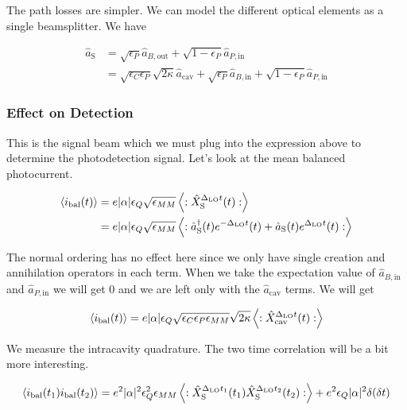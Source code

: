 \documentclass[12pt]{article}
\begin{document}
The path losses are simpler. We can model the different optical elements as a single beamsplitter. We have

\begin{align}
\hat{a}_{\text{S}} &= \sqrt{\epsilon_P}\hat{a}_{B,\text{out}} + \sqrt{1-\epsilon_P}\hat{a}_{P,\text{in}}\\
&= \sqrt{\epsilon_C \epsilon_P} \sqrt{2\kappa}\hat{a}_{\text{cav}} + \sqrt{\epsilon_P}\hat{a}_{B,\text{in}} + \sqrt{1-\epsilon_P}\hat{a}_{P,\text{in}}
\end{align}

\subsubsection{Effect on Detection}

This is the signal beam which we must plug into the expression above to determine the photodetection signal. Let's look at the mean balanced photocurrent.

\begin{align}
\Braket{i_{\text{bal}}(t)} &= e|\alpha|\epsilon_Q \sqrt{\epsilon_{MM}} \Braket{:\hat{X}_{\text{S}}^{\Delta_{\text{LO}}t}(t):}\\
&= e|\alpha|\epsilon_Q \sqrt{\epsilon_{MM}} \Braket{:\hat{a}^{\dag}_{\text{S}}(t)e^{-\Delta_{\text{LO}}t}(t) + \hat{a}_{\text{S}}(t)e^{\Delta_{\text{LO}}t}(t):}
\end{align}

The normal ordering has no effect here since we only have single creation and annihilation operators in each term. When we take the expectation value of $\hat{a}_{B,\text{in}}$ and $\hat{a}_{P,\text{in}}$ we will get $0$ and we are left only with the $\hat{a}_{\text{cav}}$ terms. We will get

\begin{align}
\Braket{i_{\text{bal}}(t)} &= e|\alpha|\epsilon_Q \sqrt{\epsilon_C \epsilon_P \epsilon_{MM}} \sqrt{2\kappa} \Braket{:\hat{X}_{\text{cav}}^{\Delta_{\text{LO}}t}(t):}\\
\end{align}

We measure the intracavity quadrature. The two time correlation will be a bit more interesting.

\begin{align}
\Braket{i_{\text{bal}}(t_1)i_{\text{bal}}(t_2)} = e^2 |\alpha|^2 \epsilon_Q^2 \epsilon_{MM} \Braket{:\hat{X}_{\text{S}}^{\Delta_{\text{LO}}t_1}(t_1)\hat{X}_{\text{S}}^{\Delta_{\text{LO}}t_2}(t_2) :} + e^2 \epsilon_Q |\alpha|^2 \delta(\delta t)
\end{align}
\end{document}
